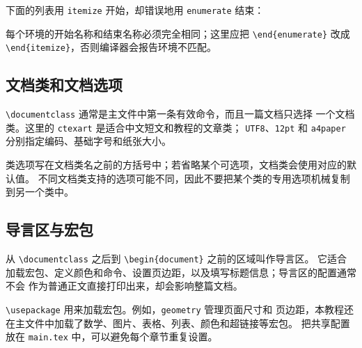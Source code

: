 \begin{errorbox}
下面的列表用 \texttt{itemize} 开始，却错误地用 \texttt{enumerate} 结束：
每个环境的开始名称和结束名称必须完全相同；这里应把
\texttt{\textbackslash end\{enumerate\}} 改成
\texttt{\textbackslash end\{itemize\}}，否则编译器会报告环境不匹配。
\end{errorbox}

\subsection{文档类和文档选项}

\texttt{\textbackslash documentclass} 通常是主文件中第一条有效命令，而且一篇文档只选择
一个文档类。这里的 \texttt{ctexart} 是适合中文短文和教程的文章类；
\texttt{UTF8}、\texttt{12pt} 和 \texttt{a4paper} 分别指定编码、基础字号和纸张大小。


类选项写在文档类名之前的方括号中；若省略某个可选项，文档类会使用对应的默认值。
不同文档类支持的选项可能不同，因此不要把某个类的专用选项机械复制到另一个类中。

\subsection{导言区与宏包}

从 \texttt{\textbackslash documentclass} 之后到
\texttt{\textbackslash begin\{document\}} 之前的区域叫作导言区。
它适合加载宏包、定义颜色和命令、设置页边距，以及填写标题信息；导言区的配置通常不会
作为普通正文直接打印出来，却会影响整篇文档。

\texttt{\textbackslash usepackage} 用来加载宏包。例如，\texttt{geometry} 管理页面尺寸和
页边距，本教程还在主文件中加载了数学、图片、表格、列表、颜色和超链接等宏包。
把共享配置放在 \texttt{main.tex} 中，可以避免每个章节重复设置。

